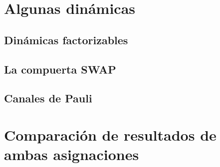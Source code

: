 \section{Algunas dinámicas}

\subsection{Dinámicas factorizables}

\subsection{La compuerta SWAP}

\subsection{Canales de Pauli}

\section{Comparación de resultados de ambas asignaciones}